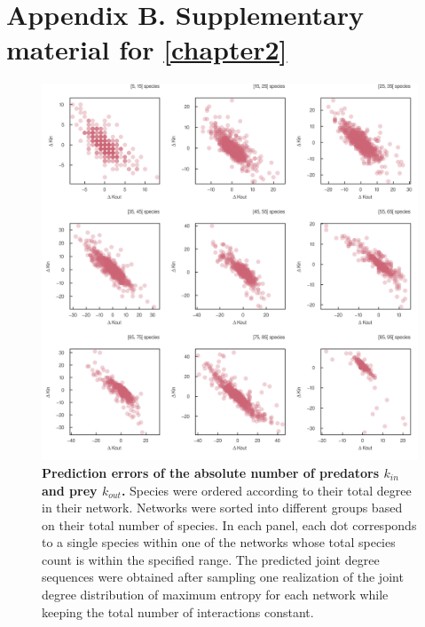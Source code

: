 
\francais   

\chapter*{Appendix B. Supplementary material for \autoref{chapter2}}

\begin{figure}[h]
    \centering
    \includegraphics[width=\textwidth]{figures/S_article2/kin_kout_difference_strata.png}
    \caption{\textbf{Prediction errors of the absolute number of predators $k_{in}$ and prey
    $k_{out}$.} Species were ordered according to their total degree in their
    network. Networks were sorted into different groups based on their total number
    of species. In each panel, each dot corresponds to a single species within one
    of the networks whose total species count is within the specified range. The
    predicted joint degree sequences were obtained after sampling one realization of
    the joint degree distribution of maximum entropy for each network while keeping
    the total number of interactions
    constant.}
    \label{fig:kin_kout_diff_strata}
\end{figure}

